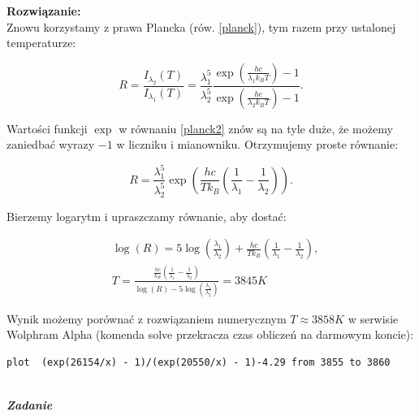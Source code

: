 \documentclass[11pt,a4paper]{article}
\newcounter{zadanie}\newcommand{\zadanie}[1][]{\addtocounter{zadanie}{1} ~\\  {\bf \emph{Zadanie \arabic{zadanie} #1 }} \\}
\begin{document}
\vskip 10pt
\textbf{Rozwiązanie:}\\
Znowu korzystamy z prawa Plancka (rów. \eqref{planck}), tym razem przy ustalonej temperaturze:

\begin{equation}
  R = \frac{I_{\lambda_2}(T)}{I_{\lambda_1}(T)} =
  \frac{\lambda_1^5}{\lambda_2^5}
  \frac{\exp\left(\frac{h c}{\lambda_1 k_B T}\right)-1}{\exp\left(\frac{h c}{\lambda_2 k_B T}\right)-1}. \label{planck2}
\end{equation}

Wartości funkcji $\exp$ w równaniu \eqref{planck2} znów są na tyle duże, że możemy zaniedbać
wyrazy $-1$ w liczniku i mianowniku. Otrzymujemy proste równanie:

\begin{equation}
R = \frac{\lambda_1^5}{\lambda_2^5} \exp\left(\frac{h c}{T k_B}\left( \frac{1}{\lambda_1}-\frac{1}{\lambda_2}\right)\right).
\end{equation}

Bierzemy logarytm i upraszczamy równanie, aby dostać:

\begin{align}
&\log(R) = 5 \log\left(\frac{\lambda_1}{\lambda_2}\right) + \frac{h c}{T k_B}\left( \frac{1}{\lambda_1}-\frac{1}{\lambda_2}\right),\\
  &T = \frac{\frac{h c}{k_B}\left( \frac{1}{\lambda_1}-
    \frac{1}{\lambda_2}\right)}{\log(R)-5 \log\left(\frac{\lambda_1}{\lambda_2}\right)} =  3845K
\end{align}

Wynik możemy porównać z rozwiązaniem numerycznym $T \approx 3858K$ w serwisie Wolphram Alpha
(komenda solve przekracza czas obliczeń na darmowym koncie):
\begin{verbatim}
plot  (exp(26154/x) - 1)/(exp(20550/x) - 1)-4.29 from 3855 to 3860
\end{verbatim}

\newpage
\zadanie
\end{document}

